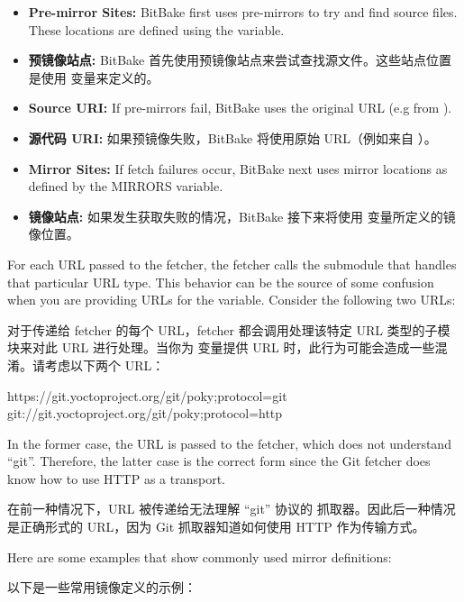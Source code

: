 \begin{itemize}
\setlength\itemsep{1.0em}
\item \textbf{Pre-mirror Sites:} BitBake first uses pre-mirrors to try and find source files. These locations are defined using the  variable.
\item \textbf{预镜像站点:} BitBake 首先使用预镜像站点来尝试查找源文件。这些站点位置是使用  变量来定义的。

\item \textbf{Source URI:} If pre-mirrors fail, BitBake uses the original URL (e.g from ).
\item \textbf{源代码 URI:} 如果预镜像失败，BitBake 将使用原始 URL（例如来自 ）。

\item \textbf{Mirror Sites:} If fetch failures occur, BitBake next uses mirror locations as defined by the MIRRORS variable.
\item \textbf{镜像站点:} 如果发生获取失败的情况，BitBake 接下来将使用  变量所定义的镜像位置。
\end{itemize}

For each URL passed to the fetcher, the fetcher calls the submodule that handles that particular URL type. This behavior can be the source of some confusion when you are providing URLs for the  variable. Consider the following two URLs:

对于传递给 fetcher 的每个 URL，fetcher 都会调用处理该特定 URL 类型的子模块来对此 URL 进行处理。当你为  变量提供 URL 时，此行为可能会造成一些混淆。请考虑以下两个 URL：

\begin{pyglist}
https://git.yoctoproject.org/git/poky;protocol=git
git://git.yoctoproject.org/git/poky;protocol=http
\end{pyglist}

In the former case, the URL is passed to the  fetcher, which does not understand ``git''. Therefore, the latter case is the correct form since the Git fetcher does know how to use HTTP as a transport.

在前一种情况下，URL 被传递给无法理解 ``git'' 协议的  抓取器。因此后一种情况是正确形式的 URL，因为 Git 抓取器知道如何使用 HTTP 作为传输方式。

Here are some examples that show commonly used mirror definitions:

以下是一些常用镜像定义的示例：

